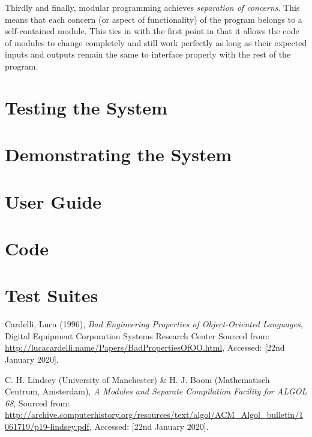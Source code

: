 \documentclass[12pt]{article}
\begin{document}
  Thirdly and finally, modular programming achieves \textit{separation of concerns}. This means that each concern (or aspect of functionality) of the program belongs to a self-contained module. This ties in with the first point in that it allows the code of modules to change completely and still work perfectly as long as their expected inputs and outputs remain the same to interface properly with the rest of the program.
  \section{Testing the System}
  \section{Demonstrating the System}

  \appendix
  \section{User Guide}
  \section{Code}
  \section{Test Suites}

  \begin{thebibliography}{9}
    Cardelli, Luca (1996),
    \textit{Bad Engineering Properties of Object-Oriented Languages},
    Digital Equipment Corporation Systems Research Center
    Sourced from: \url{http://lucacardelli.name/Papers/BadPropertiesOfOO.html},
    Accessed: [22nd January 2020].

    C. H. Lindsey (University of Manchester) \&
    H. J. Boom (Mathematisch Centrum, Amsterdam),
    \textit{A Modules and Separate Compilation Facility for ALGOL 68},
    Sourced from: \url{http://archive.computerhistory.org/resources/text/algol/ACM_Algol_bulletin/1061719/p19-lindsey.pdf},
    Accessed: [22nd January 2020].


  \end{thebibliography}
\end{document}
